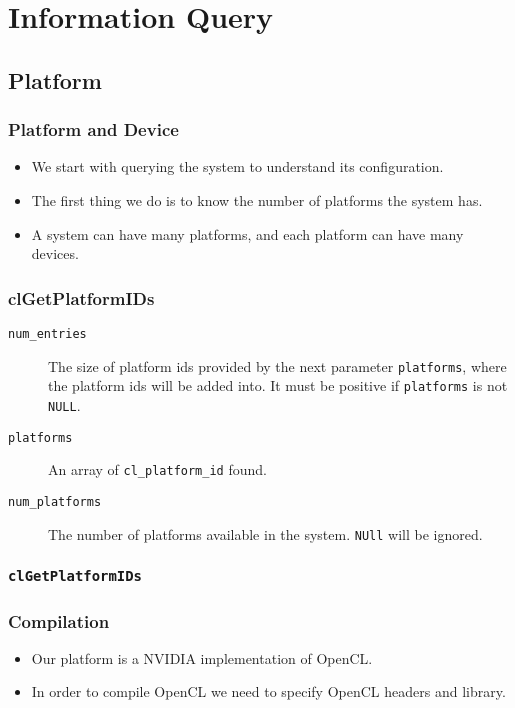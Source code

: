 \documentclass{beamer}
\begin{document}
\section{Information Query}

\subsection{Platform}

\begin{frame}
  \frametitle{Platform and Device}
  \begin{itemize}
  \item We start with querying the system to understand its
    configuration.
  \item The first thing we do is to know the number of platforms the
    system has.
  \item A system can have many platforms, and each platform can
    have many devices.
  \end{itemize}
\end{frame}

\begin{frame}
\end{frame}

\begin{frame}
  \frametitle{clGetPlatformIDs}
  \begin{description}
  \item [\tt num\_entries] The size of platform ids provided by the
    next parameter {\tt platforms}, where the platform ids will be
    added into.  It must be positive if {\tt platforms} is not {\tt
      NULL}.
  \item [\tt platforms] An array of {\tt cl\_platform\_id} found. 
  \item [\tt num\_platforms] The number of platforms available in the
    system.  {\tt NUll} will be ignored.
  \end{description}
\end{frame}

\begin{frame}
  \frametitle{\tt clGetPlatformIDs}
\end{frame}

\begin{frame}
  \frametitle{Compilation}
  \begin{itemize}
  \item Our platform is a NVIDIA implementation of OpenCL.
  \item In order to compile OpenCL we need to specify OpenCL headers
    and library.
  \end{itemize}
\end{frame}
\end{document}
